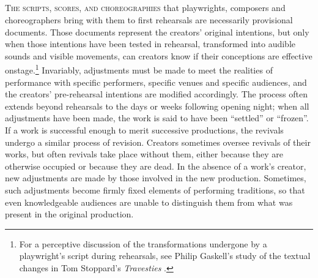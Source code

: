 \begin{paper}
\section*{} 
\textsc{The scripts, scores, and choreographies} that playwrights, composers and
choreographers bring with them to first rehearsals are necessarily provisional documents.\footnotemark[1]
\renewcommand*{\thefootnote}{\arabic{footnote}}Those documents represent the creators' original
intentions, but only when those intentions have been tested in
rehearsal, transformed into audible sounds and visible movements, can
creators know if their conceptions are effective onstage.\footnote{For a
  perceptive discussion of the transformations undergone by a
  playwright's script during rehearsals, see Philip Gaskell's study of
  the textual changes in Tom Stoppard's \emph{Travesties}  \citep[245--62]{gaskell_writer_1978}.} Invariably, adjustments must be made to meet the
realities of performance with specific performers, specific venues and
specific audiences, and the creators' pre-rehearsal intentions are
modified accordingly. The process often extends beyond rehearsals to the
days or weeks following opening night; when all adjustments have been
made, the work is said to have been ``settled'' or ``frozen''. If a work
is successful enough to merit successive productions, the revivals
undergo a similar process of revision. Creators sometimes oversee
revivals of their works, but often revivals take place without them,
either because they are otherwise occupied or because they are dead. In
the absence of a work's creator, new adjustments are made by those
involved in the new production. Sometimes, such adjustments become
firmly fixed elements of performing traditions, so that even
knowledgeable audiences are unable to distinguish them from what was
present in the original production.


\end{paper}

